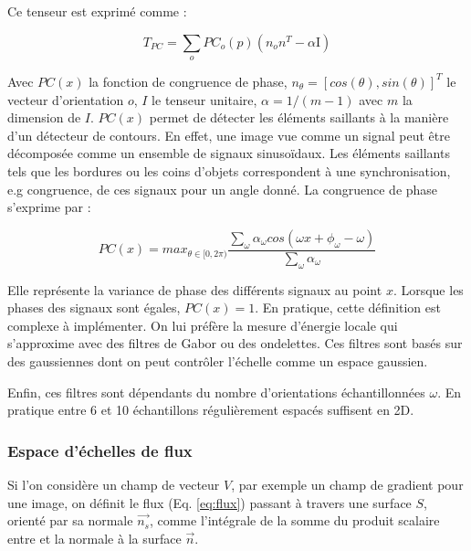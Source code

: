 Ce tenseur est exprimé comme :

\begin{equation}
  T_{PC} = \sum_o PC_{o}(p)(n_{o}n^T - \alpha \text{I})
\end{equation}

Avec $PC(x)$ la fonction de congruence de phase, $n_{\theta}=[cos(\theta),sin(\theta)]^T$ le vecteur d'orientation $o$, $I$ le tenseur unitaire, $\alpha = 1/(m-1)$ avec $m$ la dimension de $I$. $PC(x)$ permet de détecter les éléments saillants à la manière d'un détecteur de contours.
En effet, une image vue comme un signal peut être décomposée comme un ensemble de signaux sinusoïdaux. Les éléments saillants tels que les bordures ou les coins d'objets correspondent à une synchronisation, e.g congruence, de ces signaux pour un angle donné. La congruence de phase s'exprime par :

\begin{equation}
  PC(x) = max_{\theta \in [0,2\pi)}  \frac{\sum_\omega \alpha_{\omega}cos(\omega x + \phi_{\omega} - \omega)  }{\sum_\omega \alpha_{\omega} }
\end{equation}

Elle représente la variance de phase des différents signaux au point $x$. Lorsque les phases des signaux sont égales, $PC(x)=1$.
En pratique, cette définition est complexe à implémenter. On lui préfère la mesure d'énergie locale qui s'approxime avec des filtres de Gabor ou des ondelettes. Ces filtres sont basés sur des gaussiennes dont on peut contrôler l'échelle comme un espace gaussien.

Enfin, ces filtres sont dépendants du nombre d'orientations échantillonnées $\omega$. En pratique entre 6 et 10 échantillons régulièrement espacés suffisent en 2D. 


\subsubsection{Espace d'échelles de flux}
  \label{sec:EA:rehaussement:echelle:flux}
  
  
  Si l'on considère un champ de vecteur $V$, par exemple un champ de gradient pour une image, on définit le flux (Eq. \ref{eq:flux}) passant à travers une surface $S$, orienté par sa normale $\vec{n_s}$, comme l'intégrale de la somme du produit scalaire entre  et la normale à la surface $\vec{n}$.
  
